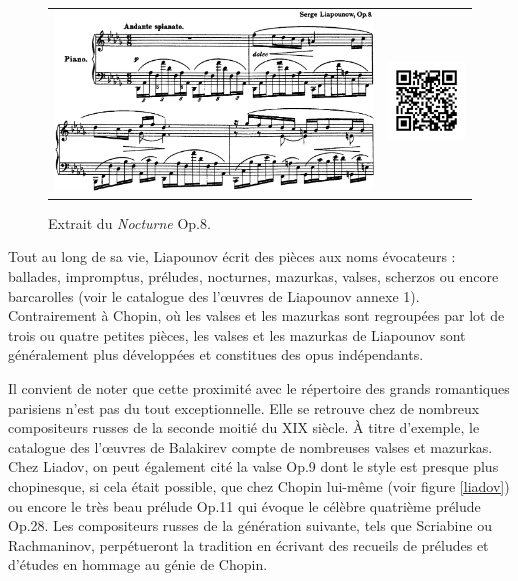 \begin{figure}[!p]
  \begin{bigcenter}
    \begin{tabular}{lr}
      \includegraphics[width=12.5cm, keepaspectratio]{op8.png}
      &
      \includegraphics[width=3cm, keepaspectratio]{op8-qr.png}
    \end{tabular}
  \end{bigcenter}
  \caption{\label{op3}Extrait du \emph{Nocturne} Op.8.}
\end{figure}

\newpage

Tout au long de sa vie, Liapounov écrit des pièces aux noms évocateurs : ballades, impromptus, préludes, nocturnes, mazurkas, valses, scherzos ou encore barcarolles (voir le catalogue des l'œuvres de Liapounov annexe 1). Contrairement à Chopin, où les valses et les mazurkas sont regroupées par lot de trois ou quatre petites pièces, les valses et les mazurkas de Liapounov sont généralement plus développées et constitues des opus indépendants.

Il convient de noter que cette proximité avec le répertoire des grands romantiques parisiens n'est pas du tout exceptionnelle. Elle se retrouve chez de nombreux compositeurs russes de la seconde moitié du XIX\ieme{} siècle. À titre d'exemple, le catalogue des l'œuvres de Balakirev compte de nombreuses valses et mazurkas. Chez Liadov, on peut également cité la valse Op.9  dont le style est presque plus chopinesque, si cela était possible, que chez Chopin lui-même (voir figure \ref{liadov}) ou encore le très beau prélude Op.11  qui évoque le célèbre quatrième prélude Op.28. Les compositeurs russes de la génération suivante, tels que Scriabine ou Rachmaninov, perpétueront la tradition en écrivant des recueils de préludes et d'études en hommage au génie de Chopin.\\

